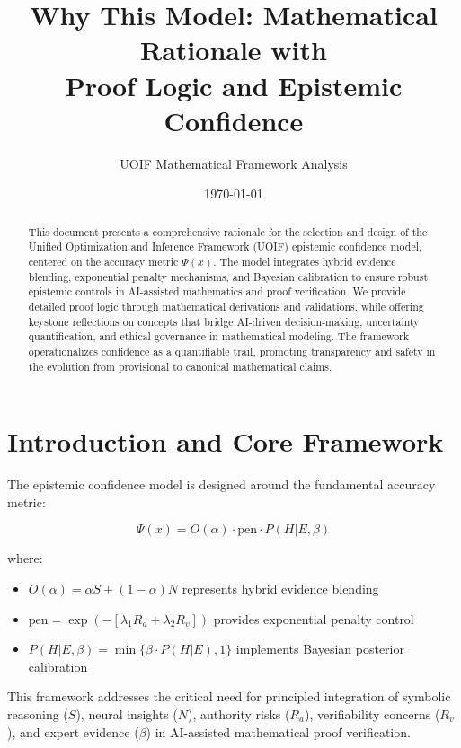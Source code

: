 \documentclass[12pt,a4paper]{article}
\title{Why This Model: Mathematical Rationale with \\
Proof Logic and Epistemic Confidence}
\author{UOIF Mathematical Framework Analysis}
\date{\today}
\theoremstyle{definition}
\theoremstyle{remark}
\begin{document}
\maketitle

\begin{abstract}
This document presents a comprehensive rationale for the selection and design of the Unified Optimization and Inference Framework (UOIF) epistemic confidence model, centered on the accuracy metric $\Psi(x)$. The model integrates hybrid evidence blending, exponential penalty mechanisms, and Bayesian calibration to ensure robust epistemic controls in AI-assisted mathematics and proof verification. We provide detailed proof logic through mathematical derivations and validations, while offering keystone reflections on concepts that bridge AI-driven decision-making, uncertainty quantification, and ethical governance in mathematical modeling. The framework operationalizes confidence as a quantifiable trail, promoting transparency and safety in the evolution from provisional to canonical mathematical claims.
\end{abstract}

\tableofcontents

\section{Introduction and Core Framework}

The epistemic confidence model is designed around the fundamental accuracy metric:

\begin{equation}
\boxed{\Psi(x) = O(\alpha) \cdot \text{pen} \cdot P(H|E,\beta)}
\end{equation}

where:
\begin{itemize}
    \item $O(\alpha) = \alpha S + (1-\alpha) N$ represents hybrid evidence blending
    \item $\text{pen} = \exp(-[\lambda_1 R_a + \lambda_2 R_v])$ provides exponential penalty control
    \item $P(H|E,\beta) = \min\{\beta \cdot P(H|E), 1\}$ implements Bayesian posterior calibration
\end{itemize}

This framework addresses the critical need for principled integration of symbolic reasoning ($S$), neural insights ($N$), authority risks ($R_a$), verifiability concerns ($R_v$), and expert evidence ($\beta$) in AI-assisted mathematical proof verification.
\end{document}
